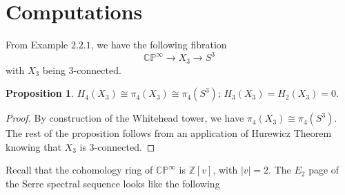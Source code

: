 \documentclass{article}
\theoremstyle{definition}
\theoremstyle{definition}
\newtheorem{proposition}{Proposition}[theorem]
\theoremstyle{definition}
\theoremstyle{definition}
\theoremstyle{definition}
\theoremstyle{definition}
\begin{document}
\section{Computations}
From Example $2.2.1$, we have the following fibration
 \[\mathbb{CP} ^{\infty}\to X_3\to S^3\] 
 with $X_3$ being $3$-connected.
 
\begin{tcolorbox}[colback=blue!5!white,colframe=blue!30!white]
\begin{proposition}
$H_4(X_3)\cong \pi_4(X_3)\cong \pi_4(S^3)$; $H_3(X_3)=H_2(X_3)=0$.
\end{proposition}
\end{tcolorbox}
\begin{proof}
	By construction of the Whitehead tower, we have $\pi_4(X_3)\cong \pi_4(S^3)$. The rest of the proposition follows from an application of Hurewicz Theorem knowing that $X_3$ is $3$-connected. 
\end{proof}


Recall that the cohomology ring of $\mathbb{CP}^{\infty}$ is $\mathbb{Z}[v]$, with $|v|=2$. The $E_2$ page of the Serre spectral sequence looks like the following 

\end{document}
